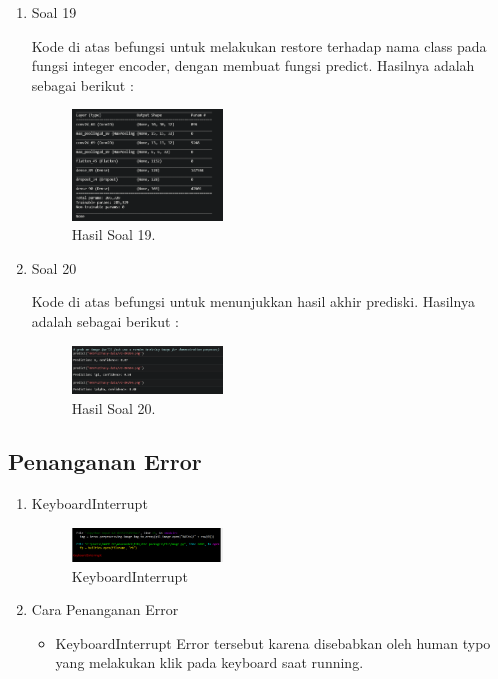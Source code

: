 \begin{enumerate}
	\item Soal 19
	\hfill\break
	
	Kode di atas befungsi untuk melakukan restore terhadap nama class pada fungsi integer encoder, dengan membuat fungsi predict. Hasilnya adalah sebagai berikut :  
	\begin{figure}[H]
	\centering
		\includegraphics[width=4cm]{figures/1174021/tugas7/materi/hasil19.PNG}
		\caption{Hasil Soal 19.}
	\end{figure}

	\item Soal 20
	\hfill\break
	
	Kode di atas befungsi untuk menunjukkan hasil akhir prediski. Hasilnya adalah sebagai berikut :  
	\begin{figure}[H]
	\centering
		\includegraphics[width=4cm]{figures/1174021/tugas7/materi/hasil20.PNG}
		\caption{Hasil Soal 20.}
	\end{figure}
\end{enumerate}

\subsection{Penanganan Error}
\begin{enumerate}
	\item KeyboardInterrupt
	\begin{figure}[H]
		\includegraphics[width=4cm]{figures/1174021/tugas7/error/1.PNG}
		\centering
		\caption{KeyboardInterrupt}
	\end{figure}

	\item Cara Penanganan Error
	\begin{itemize}
		\item KeyboardInterrupt
		\hfill\break
		Error tersebut karena disebabkan oleh human typo yang melakukan klik pada keyboard saat running.
	\end{itemize}
\end{enumerate}

